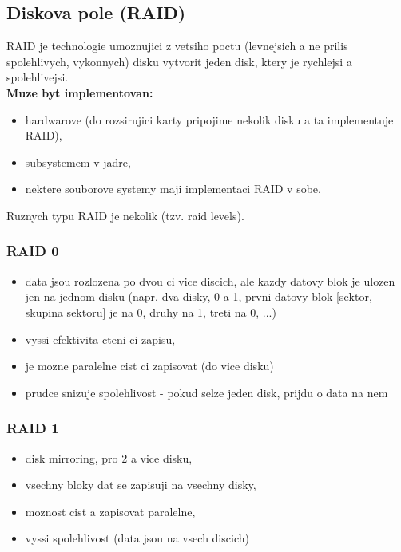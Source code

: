 \documentclass[a4paper, 11pt]{article}
\begin{document}
\subsection{Diskova pole (RAID)} \label{RAIDs}
RAID je technologie umoznujici z vetsiho poctu (levnejsich a ne prilis spolehlivych, vykonnych) disku vytvorit jeden disk, ktery je rychlejsi a spolehlivejsi. \\

\noindent\textbf{Muze byt implementovan:}
\begin{itemize}
    \item hardwarove (do rozsirujici karty pripojime nekolik disku a ta implementuje RAID),
    \item subsystemem v jadre,
    \item nektere souborove systemy maji implementaci RAID v sobe.  \\
\end{itemize}

\noindent Ruznych typu RAID je nekolik (tzv. raid levels). \\

\subsubsection{RAID 0}
\begin{itemize}
    \item data jsou rozlozena po dvou ci vice discich, ale kazdy datovy blok je ulozen jen na jednom disku (napr. dva disky, 0 a 1, prvni datovy blok [sektor, skupina sektoru] je na 0, druhy na 1, treti na 0, ...)
    \item vyssi efektivita cteni ci zapisu,
    \item je mozne paralelne cist ci zapisovat (do vice disku)
    \item prudce snizuje spolehlivost - pokud selze jeden disk, prijdu o data na nem \\
\end{itemize}

\subsubsection{RAID 1}
\begin{itemize}
    \item disk mirroring, pro 2 a vice disku,
    \item vsechny bloky dat se zapisuji na vsechny disky,
    \item moznost cist a zapisovat paralelne,
    \item vyssi spolehlivost (data jsou na vsech discich) \\
\end{itemize}
\end{document}
